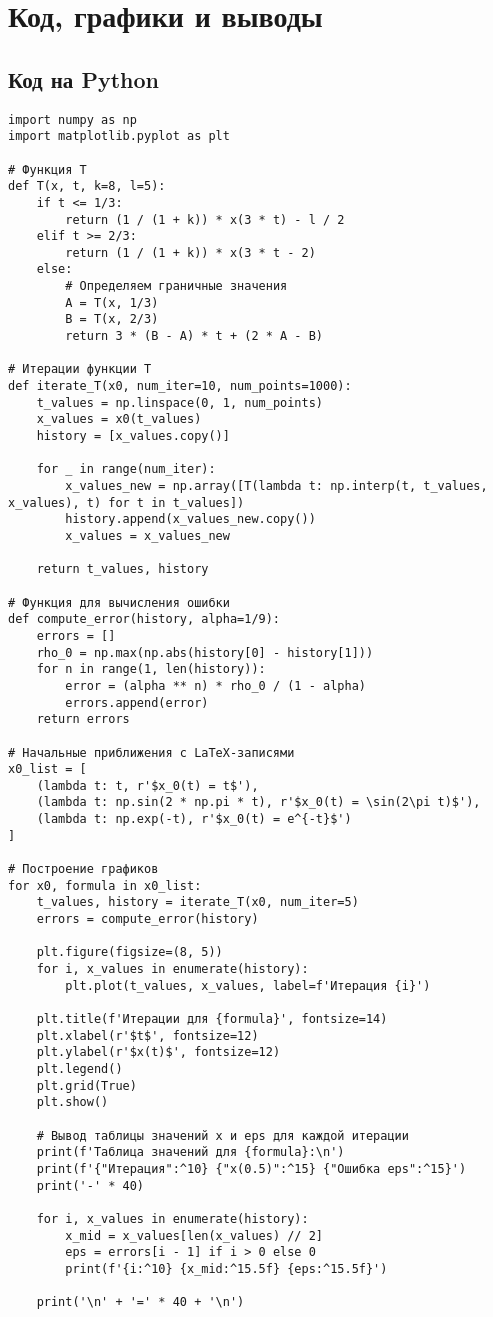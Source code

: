 \documentclass{article}
\begin{document}
\section{Код, графики и выводы}

\subsection{Код на Python}

\begin{lstlisting}
import numpy as np
import matplotlib.pyplot as plt

# Функция T
def T(x, t, k=8, l=5):
    if t <= 1/3:
        return (1 / (1 + k)) * x(3 * t) - l / 2
    elif t >= 2/3:
        return (1 / (1 + k)) * x(3 * t - 2)
    else:
        # Определяем граничные значения
        A = T(x, 1/3)
        B = T(x, 2/3)
        return 3 * (B - A) * t + (2 * A - B)

# Итерации функции T
def iterate_T(x0, num_iter=10, num_points=1000):
    t_values = np.linspace(0, 1, num_points)
    x_values = x0(t_values)
    history = [x_values.copy()]
    
    for _ in range(num_iter):
        x_values_new = np.array([T(lambda t: np.interp(t, t_values, x_values), t) for t in t_values])
        history.append(x_values_new.copy())
        x_values = x_values_new
    
    return t_values, history

# Функция для вычисления ошибки
def compute_error(history, alpha=1/9):
    errors = []
    rho_0 = np.max(np.abs(history[0] - history[1]))
    for n in range(1, len(history)):
        error = (alpha ** n) * rho_0 / (1 - alpha)
        errors.append(error)
    return errors

# Начальные приближения с LaTeX-записями
x0_list = [
    (lambda t: t, r'$x_0(t) = t$'),
    (lambda t: np.sin(2 * np.pi * t), r'$x_0(t) = \sin(2\pi t)$'),
    (lambda t: np.exp(-t), r'$x_0(t) = e^{-t}$')
]

# Построение графиков
for x0, formula in x0_list:
    t_values, history = iterate_T(x0, num_iter=5)
    errors = compute_error(history)
    
    plt.figure(figsize=(8, 5))
    for i, x_values in enumerate(history):
        plt.plot(t_values, x_values, label=f'Итерация {i}')
    
    plt.title(f'Итерации для {formula}', fontsize=14)
    plt.xlabel(r'$t$', fontsize=12)
    plt.ylabel(r'$x(t)$', fontsize=12)
    plt.legend()
    plt.grid(True)
    plt.show()

    # Вывод таблицы значений x и eps для каждой итерации
    print(f'Таблица значений для {formula}:\n')
    print(f'{"Итерация":^10} {"x(0.5)":^15} {"Ошибка eps":^15}')
    print('-' * 40)
    
    for i, x_values in enumerate(history):
        x_mid = x_values[len(x_values) // 2]
        eps = errors[i - 1] if i > 0 else 0  
        print(f'{i:^10} {x_mid:^15.5f} {eps:^15.5f}')
    
    print('\n' + '=' * 40 + '\n')

\end{lstlisting}
\end{document}
